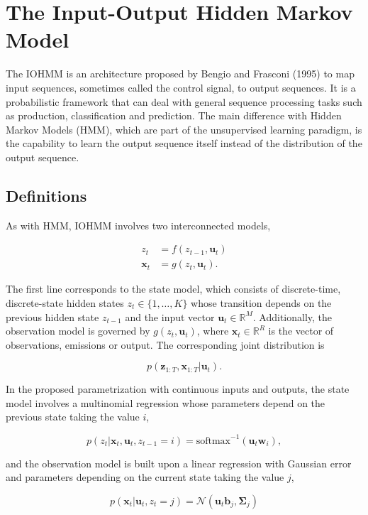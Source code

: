 \documentclass[]{article}
\newcommand{\mat}[1]{\mathbf{#1}}
\newcommand{\RR}{\mathbb{R}}
\begin{document}
{{{\section{The Input-Output Hidden Markov
Model}\label{the-input-output-hidden-markov-model}

The IOHMM is an architecture proposed by Bengio and Frasconi (1995) to
map input sequences, sometimes called the control signal, to output
sequences. It is a probabilistic framework that can deal with general
sequence processing tasks such as production, classification and
prediction. The main difference with Hidden Markov Models (HMM), which
are part of the unsupervised learning paradigm, is the capability to
learn the output sequence itself instead of the distribution of the
output sequence.

\subsection{Definitions}\label{definitions}

As with HMM, IOHMM involves two interconnected models,

\begin{align*}
z_{t} &= f(z_{t-1}, \mat{u}_{t}) \\
\mat{x}_{t} &= g(z_{t  }, \mat{u}_{t}).
\end{align*}

The first line corresponds to the state model, which consists of
discrete-time, discrete-state hidden states \(z_t \in \{1, \dots, K\}\)
whose transition depends on the previous hidden state \(z_{t-1}\) and
the input vector \(\mat{u}_{t} \in \RR^M\). Additionally, the
observation model is governed by \(g(z_{t}, \mat{u}_{t})\), where
\(\mat{x}_t \in \RR^R\) is the vector of observations, emissions or
output. The corresponding joint distribution is

\[
p(\mat{z}_{1:T}, \mat{x}_{1:T} | \mat{u}_{t}).
\]

In the proposed parametrization with continuous inputs and outputs, the
state model involves a multinomial regression whose parameters depend on
the previous state taking the value \(i\),

\[
p(z_t | \mat{x}_{t}, \mat{u}_{t}, z_{t-1} = i) = \text{softmax}^{-1}(\mat{u}_{t} \mat{w}_i),
\]

and the observation model is built upon a linear regression with
Gaussian error and parameters depending on the current state taking the
value \(j\),

\[
p(\mat{x}_t | \mat{u}_{t}, z_{t} = j) = \mathcal{N}(\mat{u}_t \mat{b}_j, \mat{\Sigma}_j)
\]

}}}
\end{document}
